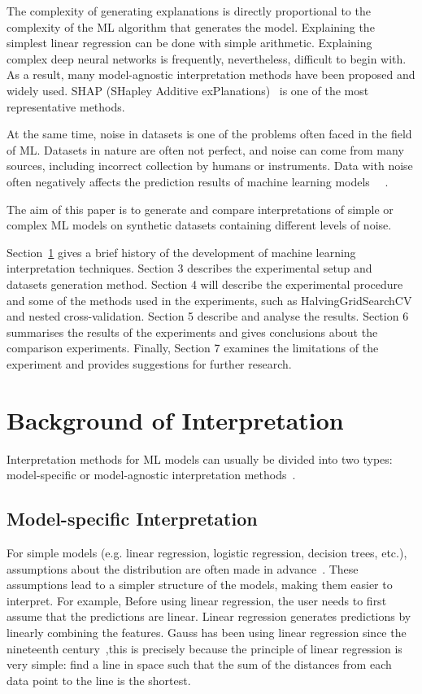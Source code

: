 \documentclass[runningheads,a4paper]{llncs}
\begin{document}
The complexity of generating explanations is directly proportional to the complexity of the ML algorithm that generates the model.
Explaining the simplest linear regression can be done with simple arithmetic. Explaining complex deep neural networks is frequently, nevertheless, difficult to begin with.
As a result, many model-agnostic interpretation methods have been proposed and widely used.
SHAP (SHapley Additive exPlanations)~\cite{lundberg2017unified} is one of the most representative methods.

At the same time, noise in datasets is one of the problems often faced in the field of ML.
Datasets in nature are often not perfect, and noise can come from many sources, including incorrect collection by humans or instruments.
Data with noise often negatively affects the prediction results of machine learning models ~\cite{GUPTA2019466}~\cite{saseendran2019impact}.

The aim of this paper is to generate and compare interpretations of simple or complex ML models on synthetic datasets containing different levels of noise.

Section~\ref{section background} gives a brief history of the development of machine learning interpretation techniques. 
Section 3 describes the experimental setup and datasets generation method. 
Section 4 will describe the experimental procedure and some of the methods used in the experiments, such as HalvingGridSearchCV and nested cross-validation.
Section 5 describe and analyse the results. 
Section 6 summarises the results of the experiments and gives conclusions about the comparison experiments.
Finally, Section 7 examines the limitations of the experiment and provides suggestions for further research.

\section{Background of Interpretation}\label{section background}

Interpretation methods for ML models can usually be divided into two types: model-specific or model-agnostic interpretation methods~\cite{doshivelez2017rigorous}.

\subsection{Model-specific Interpretation}

For simple models (e.g. linear regression, logistic regression, decision trees, etc.), assumptions about the distribution  are often made in advance~\cite{doshivelez2017rigorous}.
These assumptions lead to a simpler structure of the models, making them easier to interpret.
For example, Before using linear regression, the user needs to first assume that the predictions are linear.
Linear regression generates predictions by linearly combining the features.
Gauss has been using linear regression since the nineteenth century~\cite{gauss1877theoria},this is precisely because the principle of linear regression is very simple: find a line in space such that the sum of the distances from each data point to the line is the shortest.
\end{document}
